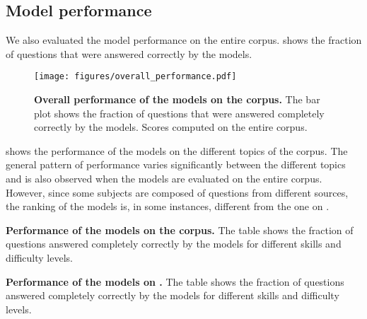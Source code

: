 \normalsize


\clearpage
\subsection{Model performance} \label{sec:model_performance_app}
We also evaluated the model performance on the entire \chembench corpus.
 shows the fraction of questions that were answered correctly by the models.

\begin{figure}[htb]
    \centering
    \texttt{[image: figures/overall\_performance.pdf]}
    \caption{\textbf{Overall performance of the models on the \chembench corpus.} The bar plot shows the fraction of questions that were answered completely correctly by the models. Scores computed on the entire \chembench corpus.}
    \label{fig:barplot_all_correct_all_questions}
\end{figure}

 shows the performance of the models on the different topics of the \chembench corpus.
The general pattern of performance varies significantly between the different topics and is also observed when the models are evaluated on the entire corpus.
However, since some subjects are composed of questions from different sources, the ranking of the models is, in some instances, different from the one on \chembenchmini.

\begin{table}
    \caption{\textbf{Performance of the models on the \chembench corpus.} The table shows the fraction of questions answered completely correctly by the models for different skills and difficulty levels.}
    \label{tab:performance_table}
\end{table}

\begin{table}
    \caption{\textbf{Performance of the models on \chembenchmini.} The table shows the fraction of questions answered completely correctly by the models for different skills and difficulty levels.}
    \label{tab:performance_table_human_subset}
\end{table}

